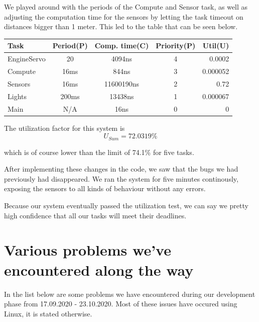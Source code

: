 \documentclass{article}
\begin{document}
We played around with the periods of the Compute and Sensor task, as well as adjusting the computation time for the sensors by letting the task timeout on distances bigger than 1 meter. This led to the table that can be seen below.

\begin{center}
 \begin{tabular}{||l c c c|r||}
 \hline
   Task & Period(P) & Comp. time(C) & Priority(P) & Util(U) \\ [0.5ex]
 \hline\hline
   EngineServo & 20 & 4094ns & 4 & 0.0002 \\
 \hline
   Compute & 16ms & 844ns & 3 & 0.000052 \\
 \hline
   Sensors & 16ms & 11600190ns & 2 & 0.72 \\
 \hline
   Lights & 200ms & 13438ns & 1 & 0.000067 \\
 \hline
   Main & N/A & 16ns & 0 & 0 \\ [1ex]
 \hline
\end{tabular}
\end{center}

The utilization factor for this system is
\begin{equation*}
  U_{Sum} = 72.0319\%
\end{equation*}

which is of course lower than the limit of 74.1\% for five tasks.

After implementing these changes in the code, we saw that the bugs we had previously had disappeared. We ran the system for five minutes continously, exposing the sensors to all kinds of behaviour without any errors.

Because our system eventually passed the utilization test, we can say we pretty high confidence that all our tasks will meet their deadlines.


\section{Various problems we've encountered along the way}
In the list below are some problems we have encountered during our development phase from 17.09.2020 - 23.10.2020. Most of these issues have occured using Linux, it is stated otherwise.
\end{document}
